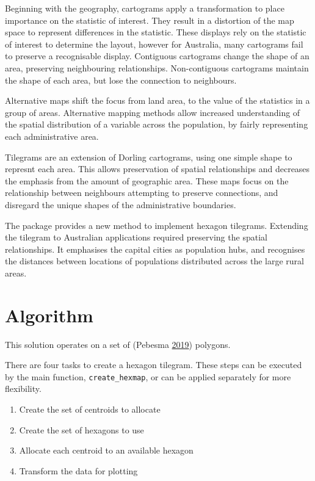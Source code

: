 Beginning with the geography, cartograms apply a transformation to place
importance on the statistic of interest. They result in a distortion of
the map space to represent differences in the statistic. These displays
rely on the statistic of interest to determine the layout, however for
Australia, many cartograms fail to preserve a recognisable display.
Contiguous cartograms change the shape of an area, preserving
neighbouring relationships. Non-contiguous cartograms maintain the shape
of each area, but lose the connection to neighbours.

Alternative maps shift the focus from land area, to the value of the
statistics in a group of areas. Alternative mapping methods allow
increased understanding of the spatial distribution of a variable across
the population, by fairly representing each administrative area.

Tilegrams are an extension of Dorling cartograms, using one simple shape
to represnt each area. This allows preservation of spatial relationships
and decreases the emphasis from the amount of geographic area. These
maps focus on the relationship between neighbours attempting to preserve
connections, and disregard the unique shapes of the administrative
boundaries.

The  package provides a new method to implement
hexagon tilegrams. Extending the tilegram to Australian applications
required preserving the spatial relationships. It emphasises the capital
cities as population hubs, and recognises the distances between
locations of populations distributed across the large rural areas.

\hypertarget{algorithm}{%
\section{Algorithm}\label{algorithm}}

This solution operates on a set of  (Pebesma
\protect\hyperlink{ref-sf}{2019}) polygons.

There are four tasks to create a hexagon tilegram. These steps can be
executed by the main function, \texttt{create\_hexmap}, or can be
applied separately for more flexibility.

\begin{enumerate}
\def\labelenumi{\arabic{enumi}.}
\tightlist
\item
  Create the set of centroids to allocate
\item
  Create the set of hexagons to use
\item
  Allocate each centroid to an available hexagon
\item
  Transform the data for plotting
\end{enumerate}

